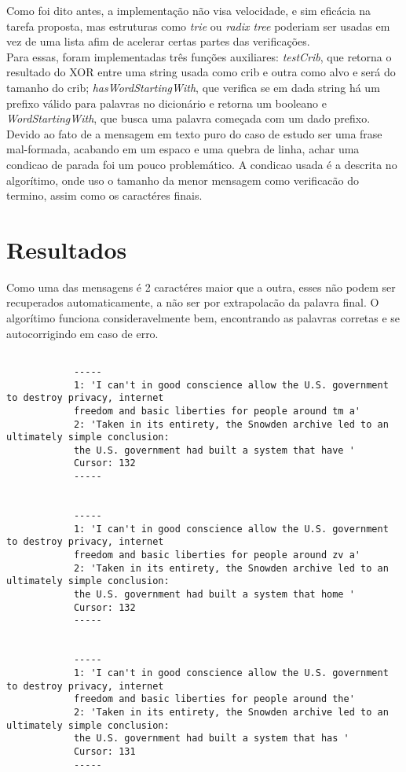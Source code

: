 \documentclass[10pt]{article}
\begin{document}
        Como foi dito antes, a implementação não visa velocidade, e sim eficácia na tarefa proposta, mas estruturas como \textit{trie} ou \textit{radix tree} poderiam ser usadas em vez de uma lista afim de acelerar certas partes das verificações.\\

        Para essas, foram implementadas três funções auxiliares: \textit{testCrib}, que retorna o resultado do XOR entre uma string usada como crib e outra como alvo e será do tamanho do crib; \textit{hasWordStartingWith}, que verifica se em dada string há um prefixo válido para palavras no dicionário e retorna um booleano e \textit{WordStartingWith}, que busca uma palavra começada com um dado prefixo. \\

        Devido ao fato de a mensagem em texto puro do caso de estudo ser uma frase mal-formada, acabando em um espaco e uma quebra de linha, achar uma condicao de parada foi um pouco problemático. A condicao usada é a descrita no algorítimo, onde uso o tamanho da menor mensagem como verificacão do termino, assim como os caractéres finais. 

    \newpage

    \section{Resultados}
    	Como uma das mensagens é 2 caractéres maior que a outra, esses não podem ser recuperados automaticamente, a não ser por extrapolacão da palavra final. O algorítimo funciona consideravelmente bem, encontrando as palavras corretas e se autocorrigindo em caso de erro. \\

    	\begin{verbatim}
    		
			-----
			1: 'I can't in good conscience allow the U.S. government to destroy privacy, internet 
			freedom and basic liberties for people around tm a'
			2: 'Taken in its entirety, the Snowden archive led to an ultimately simple conclusion: 
			the U.S. government had built a system that have '
			Cursor: 132
			-----


			-----
			1: 'I can't in good conscience allow the U.S. government to destroy privacy, internet 
			freedom and basic liberties for people around zv a'
			2: 'Taken in its entirety, the Snowden archive led to an ultimately simple conclusion: 
			the U.S. government had built a system that home '
			Cursor: 132
			-----


			-----
			1: 'I can't in good conscience allow the U.S. government to destroy privacy, internet 
			freedom and basic liberties for people around the'
			2: 'Taken in its entirety, the Snowden archive led to an ultimately simple conclusion: 
			the U.S. government had built a system that has '
			Cursor: 131
			-----

    	\end{verbatim}
\end{document}
